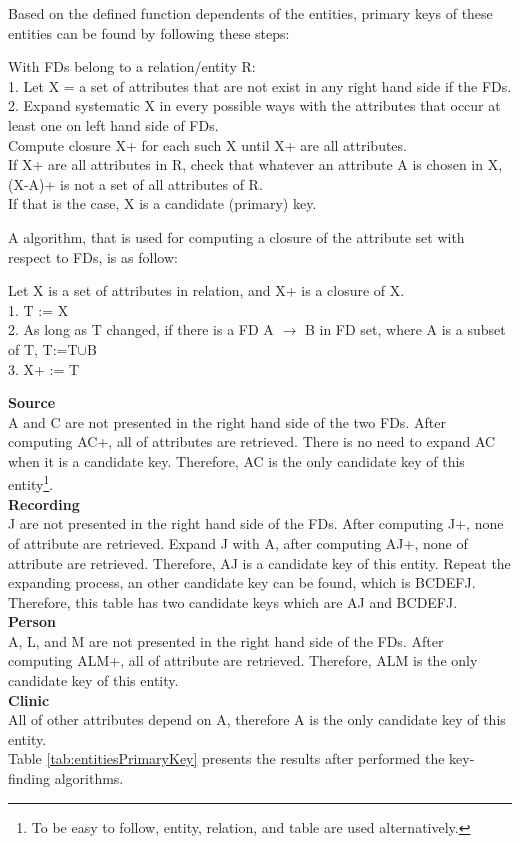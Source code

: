 Based on the defined function dependents of the entities, primary keys of these entities can be found by following these steps\citep{INF3100_Recipe_book}:
\begin{adjustwidth}{1cm}{}
With FDs belong to a relation/entity R:\\
1. Let X = a set of attributes that are not exist in any right hand side if the FDs.\\
2. Expand systematic X in every possible ways with the attributes that occur at least one on left hand side of FDs.\\
Compute closure X+ for each such X until X+ are all attributes.\\
If X+ are all attributes in R, check that whatever an attribute A is chosen in X, (X-A)+ is not a set of all attributes of R.\\
If that is the case, X is a candidate (primary) key.
\end{adjustwidth}
A algorithm, that is used for computing a closure of the attribute set with respect to FDs, is as follow\citep{INF3100_Recipe_book}:
\begin{adjustwidth}{1cm}{}
Let X is a set of attributes in relation, and X+ is a closure of X.\\
1. T := X\\
2. As long as T changed, if there is a FD A $\rightarrow$ B in FD set, where A is a subset of T, T:=T$\cup$B\\
3. X+ := T
\end{adjustwidth}

\textbf{Source}\\
A and C are not presented in the right hand side of the two FDs. After computing AC+, all of attributes are retrieved. There is no need to expand AC when it is a candidate key.
Therefore, AC is the only candidate key of this entity\footnote{To be easy to follow, entity, relation, and table are used alternatively.}.\\
\textbf{Recording}\\
J are not presented in the right hand side of the FDs. After computing J+, none of attribute are retrieved. Expand J with A, after computing AJ+, none of attribute are retrieved. Therefore, AJ is a candidate key of this entity. Repeat the expanding process, an other candidate key can be found, which is BCDEFJ. Therefore, this table has two candidate keys which are AJ and BCDEFJ.\\
\textbf{Person}\\
A, L, and M are not presented in the right hand side of the FDs. After computing ALM+, all of attribute are retrieved. Therefore, ALM is the only candidate key of this entity.\\
\textbf{Clinic}\\
All of other attributes depend on A, therefore A is the only candidate key of this entity.\\
Table \ref{tab:entitiesPrimaryKey} presents the results after performed the key-finding algorithms.\\

